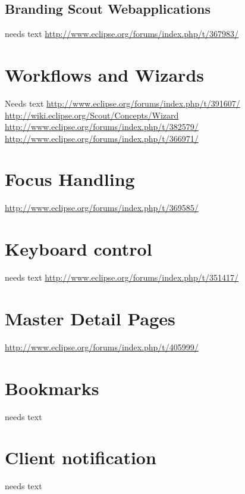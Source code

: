 \documentclass[a4paper,10pt,twoside]{book}
\begin{document}
\subsection{Branding Scout Webapplications}
needs text
\url{http://www.eclipse.org/forums/index.php/t/367983/}

\section{Workflows and Wizards}
Needs text
\url{http://www.eclipse.org/forums/index.php/t/391607/}
\url{http://wiki.eclipse.org/Scout/Concepts/Wizard}
\url{http://www.eclipse.org/forums/index.php/t/382579/}
\url{http://www.eclipse.org/forums/index.php/t/366971/}

\section{Focus Handling}
\url{http://www.eclipse.org/forums/index.php/t/369585/}

\section{Keyboard control}
needs text
\url{http://www.eclipse.org/forums/index.php/t/351417/}

\section{Master Detail Pages}
\url{http://www.eclipse.org/forums/index.php/t/405999/}

\section{Bookmarks}
needs text
  
\section{Client notification}
needs text
    
\end{document}
